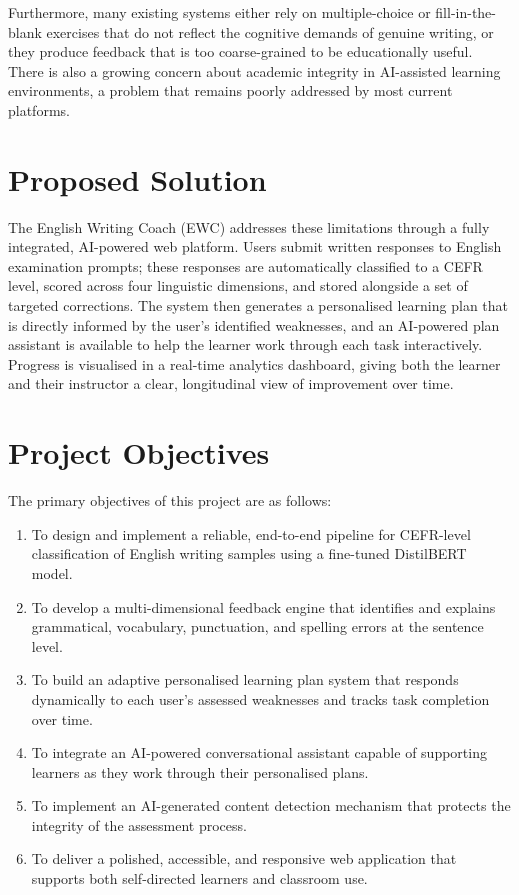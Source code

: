 \documentclass[12pt, a4paper]{report}
\begin{document}
Furthermore, many existing systems either rely on multiple-choice or fill-in-the-blank exercises that do not reflect the cognitive demands of genuine writing, or they produce feedback that is too coarse-grained to be educationally useful. There is also a growing concern about academic integrity in AI-assisted learning environments, a problem that remains poorly addressed by most current platforms.

\section{Proposed Solution}

The English Writing Coach (EWC) addresses these limitations through a fully integrated, AI-powered web platform. Users submit written responses to English examination prompts; these responses are automatically classified to a CEFR level, scored across four linguistic dimensions, and stored alongside a set of targeted corrections. The system then generates a personalised learning plan that is directly informed by the user's identified weaknesses, and an AI-powered plan assistant is available to help the learner work through each task interactively. Progress is visualised in a real-time analytics dashboard, giving both the learner and their instructor a clear, longitudinal view of improvement over time.

\section{Project Objectives}

The primary objectives of this project are as follows:

\begin{enumerate}
    \item To design and implement a reliable, end-to-end pipeline for CEFR-level classification of English writing samples using a fine-tuned DistilBERT model.
    \item To develop a multi-dimensional feedback engine that identifies and explains grammatical, vocabulary, punctuation, and spelling errors at the sentence level.
    \item To build an adaptive personalised learning plan system that responds dynamically to each user's assessed weaknesses and tracks task completion over time.
    \item To integrate an AI-powered conversational assistant capable of supporting learners as they work through their personalised plans.
    \item To implement an AI-generated content detection mechanism that protects the integrity of the assessment process.
    \item To deliver a polished, accessible, and responsive web application that supports both self-directed learners and classroom use.
\end{enumerate}
\end{document}
